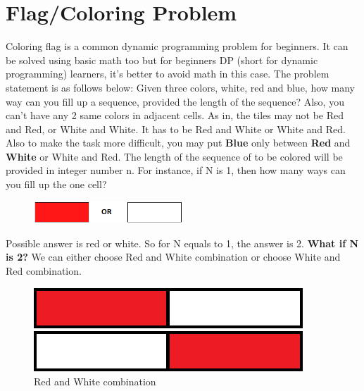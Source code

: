 \documentclass[12pt]{article}
\begin{document}
{\section{Flag/Coloring Problem}
Coloring flag is a common dynamic programming problem for beginners.
It can be solved using basic math too  but for beginners DP (short for dynamic programming) learners, it’s better to avoid math in this case.\vspace{2mm}
\newline
The problem statement is as follows below:\vspace{3mm} \newline
Given three colors, white, red and blue, how many way can you fill up a  sequence, provided the length of the sequence? Also, you can’t have any 2 same colors in adjacent cells. As in, the tiles may not be Red and Red, or White and White. It has to be Red and White or White and Red. Also to make the task more difficult, you may put \textbf{Blue} only between\textbf{ Red} and \textbf{White} or White and Red. The length of the sequence of to be colored will be provided in integer number n.\vspace{3mm}
\newline
For instance, if N is 1, then how many ways can you fill up the one cell? 
\begin{figure}[H]
\centering
\includegraphics[width=0.50\textwidth]{row.png}
\end{figure}
Possible answer is red or white. So for N equals to 1, the answer is 2.\vspace{9mm}\newline
\textbf{What if N is 2?}\vspace{3mm}\newline 
We can either choose Red and White combination or choose White and Red combination.
\begin{figure}[H]
\includegraphics[width=\linewidth]{rw.png}
\caption{Red and White combination}
\endminipage\hfill
{}%
\includegraphics[width=\linewidth]{wr.png}

\end{figure}}
\end{document}
